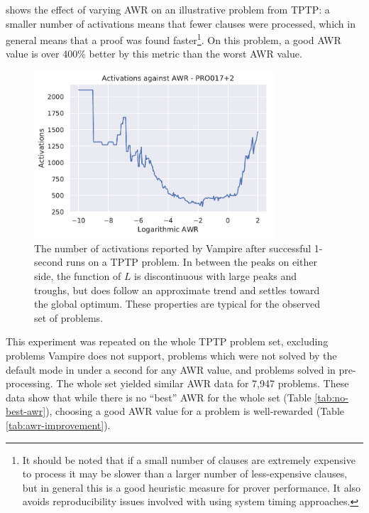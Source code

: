 \documentclass{llncs}
\begin{document}
  shows the effect of varying AWR on an illustrative problem from TPTP: a smaller number of activations means that fewer clauses were processed, which in general means that a proof was found faster\footnote{
It should be noted that if a small number of clauses are extremely expensive to process it may be slower than a larger number of less-expensive clauses, but in general this is a good heuristic measure for prover performance.
It also avoids reproducibility issues involved with using system timing approaches.
}.
On this problem, a good AWR value is over 400\% better by this metric than the worst AWR value.

\begin{figure}[t]
	\centering
	\includegraphics[width=0.8\textwidth]{example-optimal-awr}
	\caption{
The number of activations reported by Vampire after successful 1-second runs on a TPTP problem.
In between the peaks on either side, the function of \(L\) is discontinuous with large peaks and troughs, but does follow an approximate trend and settles toward the global optimum.
These properties are typical for the observed set of problems.
}
	\label{fig:example-optimal-awr}
\end{figure}

This experiment was repeated on the whole TPTP problem set, excluding problems Vampire does not support, problems which were not solved by the default mode in under a second for any AWR value, and problems solved in pre-processing.
The whole set yielded similar AWR data for 7,947 problems.
These data show that while there is no ``best'' AWR for the whole set (Table \ref{tab:no-best-awr}), choosing a good AWR value for a problem is well-rewarded (Table \ref{tab:awr-improvement}).

\end{document}
